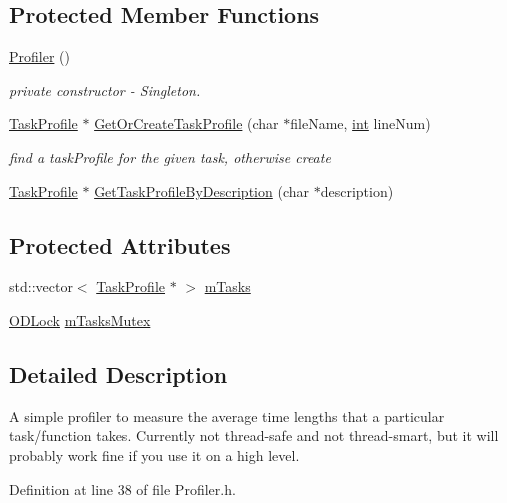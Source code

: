 \subsection*{Protected Member Functions}
\begin{DoxyCompactItemize}
\item 
\hyperlink{class_profiler_a675ebc9207b9aeace1d967c085abeacf}{Profiler} ()
\begin{DoxyCompactList}\small\item\em private constructor -\/ Singleton. \end{DoxyCompactList}\item 
\hyperlink{class_task_profile}{Task\+Profile} $\ast$ \hyperlink{class_profiler_a75cdba2b1f1c747f472c2f3210c1d523}{Get\+Or\+Create\+Task\+Profile} (char $\ast$file\+Name, \hyperlink{xmltok_8h_a5a0d4a5641ce434f1d23533f2b2e6653}{int} line\+Num)
\begin{DoxyCompactList}\small\item\em find a task\+Profile for the given task, otherwise create \end{DoxyCompactList}\item 
\hyperlink{class_task_profile}{Task\+Profile} $\ast$ \hyperlink{class_profiler_aeb2df4e7d3bbbe1b613ef496fed839fb}{Get\+Task\+Profile\+By\+Description} (char $\ast$description)
\end{DoxyCompactItemize}
\subsection*{Protected Attributes}
\begin{DoxyCompactItemize}
\item 
std\+::vector$<$ \hyperlink{class_task_profile}{Task\+Profile} $\ast$ $>$ \hyperlink{class_profiler_a7798970b1bec9bf595d7cf82cf1b9358}{m\+Tasks}
\item 
\hyperlink{class_o_d_lock}{O\+D\+Lock} \hyperlink{class_profiler_a8ff7770fe1ccf5542002ed2be12e2a5f}{m\+Tasks\+Mutex}
\end{DoxyCompactItemize}


\subsection{Detailed Description}
A simple profiler to measure the average time lengths that a particular task/function takes. Currently not thread-\/safe and not thread-\/smart, but it will probably work fine if you use it on a high level. 

Definition at line 38 of file Profiler.\+h.



